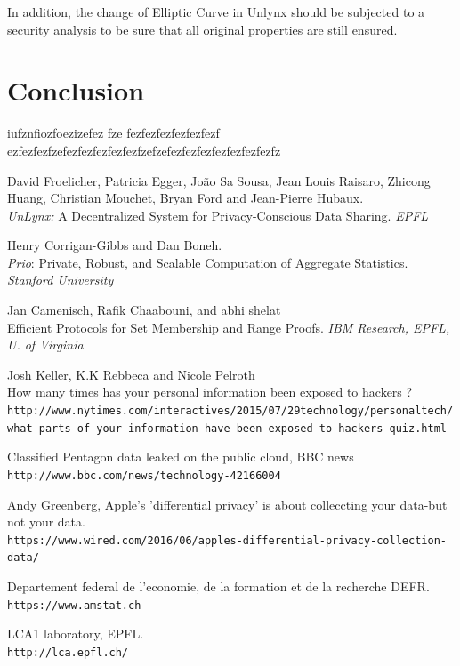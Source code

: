 \documentclass{article}
\begin{document}
In addition, the change of Elliptic Curve in Unlynx should be subjected to a security analysis to be sure that all original properties are still ensured.
\newpage
\section*{Conclusion}
iufznfiozfoezizefez fze
fezfezfezfezfezfezf
ezfezfezfzefezfezfezfezfezfzefzefezfezfezfezfezfezfezfz

\newpage
\begin{thebibliography}{9}

David Froelicher, Patricia Egger, João Sa Sousa, Jean Louis Raisaro, Zhicong Huang, Christian Mouchet, Bryan Ford and Jean-Pierre Hubaux.\\
\textit{UnLynx:} A Decentralized System for Privacy-Conscious Data Sharing. 
\textit{EPFL}
 
Henry Corrigan-Gibbs and Dan Boneh.\\
\textit{Prio}: Private, Robust, and Scalable Computation of Aggregate Statistics.
\textit{Stanford University}


Jan Camenisch, Rafik Chaabouni, and abhi shelat\\
Efficient Protocols for Set Membership and Range Proofs.
\textit{IBM Research, EPFL, U. of Virginia}

Josh Keller, K.K Rebbeca and Nicole Pelroth\\
How many times has your personal information been exposed to hackers ?
\\\texttt{http://www.nytimes.com/interactives/2015/07/29technology/personaltech/what-parts-of-your-information-have-been-exposed-to-hackers-quiz.html}

Classified Pentagon data leaked on the public cloud, BBC news
\\\texttt{http://www.bbc.com/news/technology-42166004}

Andy Greenberg, Apple's 'differential privacy' is about colleccting your data-but not your data.
\\\texttt{https://www.wired.com/2016/06/apples-differential-privacy-collection-data/}

Departement federal de l'economie, de la formation et de la recherche DEFR.
\\\texttt{https://www.amstat.ch}

LCA1 laboratory, EPFL.
\\\texttt{http://lca.epfl.ch/}


\end{thebibliography}
\end{document}
